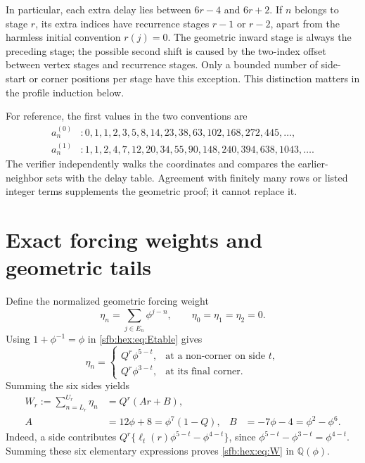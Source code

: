 \documentclass[11pt]{article}
\theoremstyle{remark}\newtheorem{remark}[theorem]{Remark}
\newcommand{\Q}{\mathbb Q}
\begin{document}
In particular, each extra delay lies between $6r-4$ and $6r+2$. If $n$ belongs to stage $r$, its extra indices have recurrence stages $r-1$ or $r-2$, apart from the harmless initial convention $r(j)=0$. The geometric inward stage is always the preceding stage; the possible second shift is caused by the two-index offset between vertex stages and recurrence stages. Only a bounded number of side-start or corner positions per stage have this exception. This distinction matters in the profile induction below.

For reference, the first values in the two conventions are
\begin{align*}
 a^{(0)}_n&: 0,1,1,2,3,5,8,14,23,38,63,102,168,272,445,\ldots,\\
 a^{(1)}_n&: 1,1,2,4,7,12,20,34,55,90,148,240,394,638,1043,\ldots.
\end{align*}
The verifier independently walks the coordinates and compares the earlier-neighbor sets with the delay table. Agreement with finitely many rows or listed integer terms supplements the geometric proof; it cannot replace it.

\section{Exact forcing weights and geometric tails}\label{sfb:hex:sec:weights}
Define the normalized geometric forcing weight
\begin{equation}\label{sfb:hex:eq:eta}
 \eta_n=\sum_{j\in E_n}\phi^{j-n},\qquad \eta_0=\eta_1=\eta_2=0.
\end{equation}
Using $1+\phi^{-1}=\phi$ in \eqref{sfb:hex:eq:Etable} gives
\begin{equation}\label{sfb:hex:eq:etavalues}
 \eta_n=\begin{cases}
 Q^r\phi^{5-t},&\text{at a non-corner on side }t,\\
 Q^r\phi^{3-t},&\text{at its final corner}.
 \end{cases}
\end{equation}
Summing the six sides yields
\begin{align}
 W_r:=\sum_{n=L_r}^{U_r}\eta_n&=Q^r(Ar+B),\label{sfb:hex:eq:W}\\
 A&=12\phi+8=\phi^7(1-Q),&
 B&=-7\phi-4=\phi^2-\phi^6.\label{sfb:hex:eq:AB}
\end{align}
Indeed, a side contributes $Q^r\{\ell_t(r)\phi^{5-t}-\phi^{4-t}\}$, since $\phi^{5-t}-\phi^{3-t}=\phi^{4-t}$. Summing these six elementary expressions proves \eqref{sfb:hex:eq:W} in $\Q(\phi)$.
\end{document}
